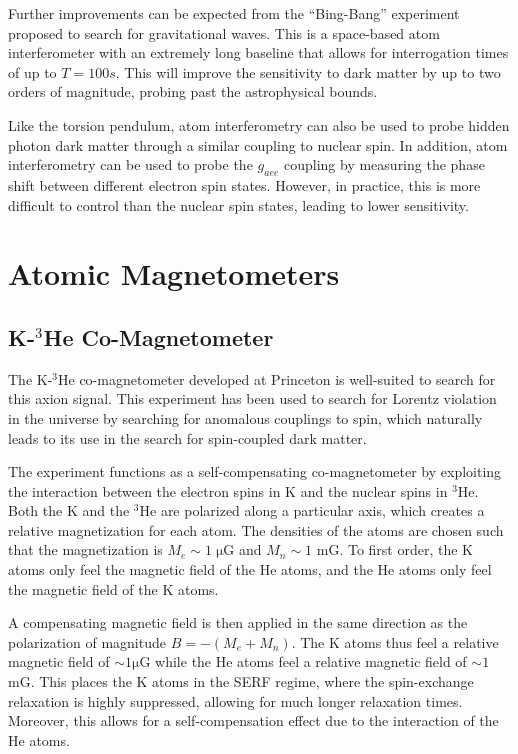 \documentclass[aps,prd,final,letterpaper]{revtex4}
\begin{document}
Further improvements can be expected from the ``Bing-Bang'' experiment proposed to search for gravitational waves. This is a space-based atom interferometer with an extremely long baseline that allows for interrogation times of up to $T = 100s$. This will improve the sensitivity to dark matter by up to two orders of magnitude, probing past the astrophysical bounds. 

Like the torsion pendulum, atom interferometry can also be used to probe hidden photon dark matter through a similar coupling to nuclear spin. In addition, atom interferometry can be used to probe the $g_{aee}$ coupling by measuring the phase shift between different electron spin states. However, in practice, this is more difficult to control than the nuclear spin states, leading to lower sensitivity.


\section{Atomic Magnetometers}

\subsection{K-$^{3}$He Co-Magnetometer}

The K-$^{3}$He co-magnetometer developed at Princeton is well-suited to search for this axion signal. This experiment has been used to search for Lorentz violation in the universe by searching for anomalous couplings to spin, which naturally leads to its use in the search for spin-coupled dark matter. 

The experiment functions as a self-compensating co-magnetometer by exploiting the interaction between the electron spins in K and the nuclear spins in $^{3}$He. Both the K and the $^3$He are polarized along a particular axis, which creates a relative magnetization for each atom. The densities of the atoms are chosen such that the magnetization is $M_e \sim 1 \; \mathrm{\mu G}$ and $M_n \sim 1$ mG. To first order, the K atoms only feel the magnetic field of the He atoms, and the He atoms only feel the magnetic field of the K atoms. 

A compensating magnetic field is then applied in the same direction as the polarization of magnitude $B = -(M_e + M_n)$. The K atoms thus feel a relative magnetic field of $\sim 1 \mathrm{\mu G}$ while the He atoms feel a relative magnetic field of $\sim 1$ mG. This places the K atoms in the SERF regime, where the spin-exchange relaxation is highly suppressed, allowing for much longer relaxation times. Moreover, this allows for a self-compensation effect due to the interaction of the He atoms. 
\end{document}
